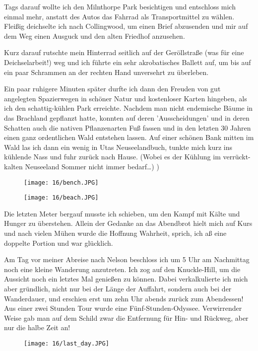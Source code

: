 Tags darauf wollte ich den Milnthorpe Park besichtigen und entschloss
mich einmal mehr, anstatt des Autos das Fahrrad als Transportmittel zu
wählen.  Fleißig deichselte ich nach Collingwood, um einen Brief
abzusenden und mir auf dem Weg einen Ausguck und den alten Friedhof
anzusehen.

Kurz darauf rutschte mein Hinterrad seitlich auf der Geröllstraße (was
für eine Deichselarbeit!) weg und ich führte ein sehr akrobatisches
Ballett auf, um bis auf ein paar Schrammen an der rechten Hand
unversehrt zu überleben.

Ein paar ruhigere Minuten später durfte ich dann den Freuden von gut
angelegten Spazierwegen in schöner Natur und kostenloser Karten
hingeben, als ich den schattig-kühlen Park erreichte. Nachdem man
nicht endemische Bäume in das Brachland gepflanzt hatte, konnten auf
deren 'Ausscheidungen' und in deren Schatten auch die nativen
Pflanzenarten Fuß fassen und in den letzten 30 Jahren einen ganz
ordentlichen Wald entstehen lassen. Auf einer schönen Bank mitten im
Wald las ich dann ein wenig in Utas Neuseelandbuch, tunkte mich kurz
ins kühlende Nass und fuhr zurück nach Hause. (Wobei es der Kühlung im
verrückt-kalten Neuseeland Sommer nicht immer bedarf\ldots) )
\begin{figure}[h]
  \centering
  \texttt{[image: 16/bench.JPG]}
\end{figure}
\begin{figure}[h]
  \centering
  \texttt{[image: 16/beach.JPG]}
\end{figure}

Die letzten Meter bergauf musste ich schieben, um den Kampf mit Kälte
und Hunger zu überstehen.  Allein der Gedanke an das Abendbrot hielt
mich auf Kurs und nach vielen Mühen wurde die Hoffnung Wahrheit,
sprich, ich aß eine doppelte Portion und war glücklich.

Am Tag vor meiner Abreise nach Nelson beschloss ich um 5 Uhr am
Nachmittag noch eine kleine Wanderung anzutreten. Ich zog auf den
Knuckle-Hill, um die Aussicht noch ein letztes Mal genießen zu können.
Dabei verkalkulierte ich mich aber gründlich, nicht nur bei der Länge
der Auffahrt, sondern auch bei der Wanderdauer, und erschien erst um
zehn Uhr abends zurück zum Abendessen! Aus einer zwei Stunden Tour wurde
eine Fünf-Stunden-Odyssee. Verwirrender Weise gab man auf dem Schild
zwar die Entfernung für Hin- und Rückweg, aber nur die halbe Zeit an!
\begin{figure}[h]
  \centering
  \texttt{[image: 16/last\_day.JPG]}
\end{figure}


